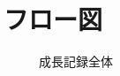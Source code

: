 \documentclass[a4j]{jarticle}
\begin{document}
\section{フロー図}

\begin{figure}[H]
\begin{center}
\caption{成長記録全体}
\label{allgrow}
\end{center}
\end{figure}
\end{document}
